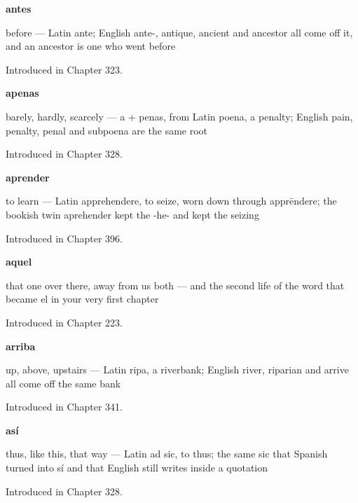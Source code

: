 \noindent\begin{minipage}[t]{\linewidth}
\raggedright
\textbf{antes}\par
\small before — Latin ante; English ante-, antique, ancient and ancestor all come off it, and an ancestor is one who went before\par
\footnotesize Introduced in Chapter 323.
\end{minipage}\par\medskip

\noindent\begin{minipage}[t]{\linewidth}
\raggedright
\textbf{apenas}\par
\small barely, hardly, scarcely — a + penas, from Latin poena, a penalty; English pain, penalty, penal and subpoena are the same root\par
\footnotesize Introduced in Chapter 328.
\end{minipage}\par\medskip

\noindent\begin{minipage}[t]{\linewidth}
\raggedright
\textbf{aprender}\par
\small to learn — Latin apprehendere, to seize, worn down through apprēndere; the bookish twin aprehender kept the -he- and kept the seizing\par
\footnotesize Introduced in Chapter 396.
\end{minipage}\par\medskip

\noindent\begin{minipage}[t]{\linewidth}
\raggedright
\textbf{aquel}\par
\small that one over there, away from us both — and the second life of the word that became el in your very first chapter\par
\footnotesize Introduced in Chapter 223.
\end{minipage}\par\medskip

\noindent\begin{minipage}[t]{\linewidth}
\raggedright
\textbf{arriba}\par
\small up, above, upstairs — Latin ripa, a riverbank; English river, riparian and arrive all come off the same bank\par
\footnotesize Introduced in Chapter 341.
\end{minipage}\par\medskip

\noindent\begin{minipage}[t]{\linewidth}
\raggedright
\textbf{así}\par
\small thus, like this, that way — Latin ad sic, to thus; the same sic that Spanish turned into sí and that English still writes inside a quotation\par
\footnotesize Introduced in Chapter 328.
\end{minipage}\par\medskip


